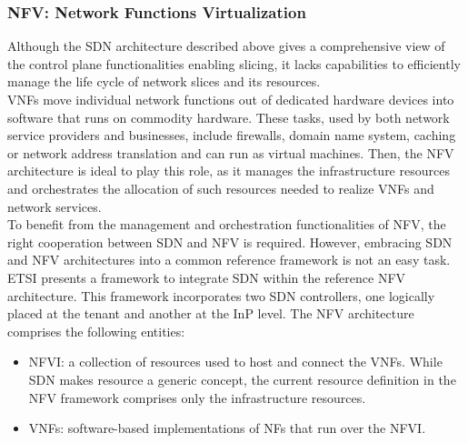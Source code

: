 \documentclass[a4paper,12pt]{report} %
\begin{document}
\subsubsection{NFV: Network Functions Virtualization}
Although the SDN architecture described above
gives a comprehensive view of the control plane
functionalities enabling slicing, it lacks capabilities
to efficiently manage the life cycle of
network slices and its resources. \\
VNFs move individual network functions out of dedicated hardware devices into software that runs on commodity hardware. These tasks, used by both network service providers and businesses, include firewalls, domain name system, caching or network address translation and can run as virtual machines. Then, the NFV architecture is ideal to play
this role, as it manages the infrastructure resources
and orchestrates the allocation of such resources
needed to realize VNFs and network services.\\
To benefit from the management and orchestration functionalities of NFV, the right cooperation between SDN and NFV is required.
However, embracing SDN and NFV architectures
into a common reference framework is not an
easy task. ETSI presents a framework
to integrate SDN within the reference NFV architecture. This framework incorporates two SDN
controllers, one logically placed at the tenant and
another at the InP level. The NFV architecture comprises the following
entities:\\
\begin{itemize}
\item \gls{NFVI}: a collection of resources used to
host and connect the VNFs. While SDN makes resource a generic concept,
the current resource definition in the NFV framework comprises only the infrastructure resources.
\end{itemize}
\begin{itemize}
\item VNFs: software-based implementations of NFs that run over the NFVI.
\end{itemize}
\end{document}
